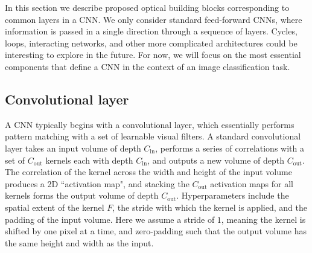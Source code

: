 

In this section we describe proposed optical building blocks corresponding to common layers in a CNN. We only consider standard feed-forward CNNs, where information is passed in a single direction through a sequence of layers. Cycles, loops, interacting networks, and other more complicated architectures could be interesting to explore in the future. For now, we will focus on the most essential components that define a CNN in the context of an image classification task.

\subsection{Convolutional layer}
A CNN typically begins with a convolutional layer, which essentially performs pattern matching with a set of learnable visual filters. A standard convolutional layer takes an input volume of depth $C_\text{in}$, performs a series of correlations with a set of $C_\text{out}$ kernels each with depth $C_\text{in}$, and outputs a new volume of depth $C_\text{out}$. The correlation of the kernel across the width and height of the input volume produces a 2D ``activation map", and stacking the $C_\text{out}$ activation maps for all kernels forms the output volume of depth $C_\text{out}$. Hyperparameters include the spatial extent of the kernel $F$, the stride with which the kernel is applied, and the padding of the input volume. Here we assume a stride of $1$, meaning the kernel is shifted by one pixel at a time, and zero-padding such that the output volume has the same height and width as the input.

